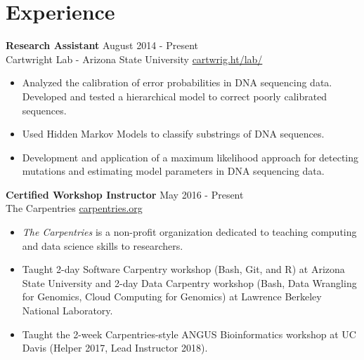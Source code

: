 \documentclass[12pt]{article}
\begin{document}
\section*{ Experience}

\noindent \textbf{Research Assistant} \hfill{} August 2014 - Present\\
Cartwright Lab - Arizona State University \hfill{}  \url{cartwrig.ht/lab/}
\begin{itemize}[nosep, leftmargin=*]
\item Analyzed the calibration of error probabilities in DNA sequencing data. Developed and tested a hierarchical model to correct poorly calibrated sequences.
\item Used Hidden Markov Models to classify substrings of DNA sequences.
\item Development and application of a maximum likelihood approach for detecting mutations and estimating model parameters in DNA sequencing data. 
\end{itemize}

\noindent \textbf{Certified Workshop Instructor} \hfill{} May 2016 - Present\\
The Carpentries \hfill{}  \url{carpentries.org}
\begin{itemize}[nosep, leftmargin=*]
\item \textit{The Carpentries} is a non-profit organization dedicated to teaching computing and data science skills to researchers.
\item Taught 2-day Software Carpentry workshop (Bash, Git, and R) at Arizona State University %
and 2-day Data Carpentry workshop (Bash, Data Wrangling for Genomics, Cloud Computing for Genomics) at Lawrence Berkeley National Laboratory. %
\item Taught the 2-week Carpentries-style ANGUS Bioinformatics workshop at UC Davis (Helper 2017, Lead Instructor 2018).
\end{itemize}

\end{document}
